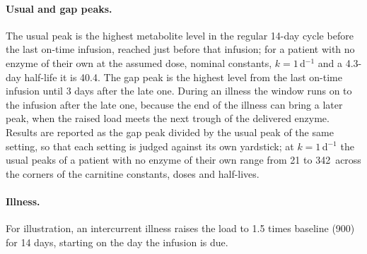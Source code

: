 \paragraph{Usual and gap peaks.} The usual peak is the highest metabolite level in the regular
14-day cycle before the last on-time infusion, reached just before that infusion; for a patient with
no enzyme of their own at the assumed dose, nominal constants, $k=1$\,d$^{-1}$ and a 4.3-day
half-life it is 40.4\uM. The gap peak is the highest
level from the last on-time infusion until 3 days after the late one. During an illness the window
runs on to the infusion after the late one, because the end of the illness can bring a later peak,
when the raised load meets the next trough of the delivered enzyme. Results are reported as the gap
peak divided by the usual peak of the same setting, so that each setting is judged against its own
yardstick; at $k=1$\,d$^{-1}$ the usual peaks of a patient with no enzyme of their own range from 21
to 342\uM\ across the corners of the carnitine constants, doses and half-lives.

\paragraph{Illness.} For illustration, an intercurrent illness raises the load to 1.5 times
baseline (900\um) for 14 days, starting on the day the infusion is due.

